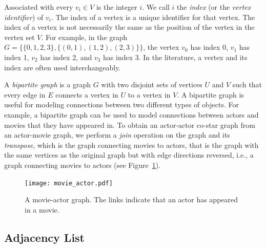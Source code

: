 Associated with every $v_i \in V$ is the integer $i$. We call $i$ the \emph{index}
(or the \emph{vertex identifier}) of $v_i$. The index of a vertex is a unique
identifier for that vertex. The index of a vertex is not necessarily the same
as the position of the vertex in the vertex set $V$. For example, in the graph
$G = \{ \{ 0, 1, 2, 3 \}, \{ (0, 1), (1, 2), (2, 3) \} \}$, the vertex $v_0$ has index 0,
$v_1$ has index 1, $v_2$ has index 2, and $v_3$ has index 3. In the literature,
a vertex and its index are often used interchangeably.



A \emph{bipartite graph} is a graph $G$ with two disjoint sets of
vertices $U$ and $V$ such that every edge in $E$ connects a vertex
in $U$ to a vertex in $V$. A bipartite graph is useful for modeling
connections between two different types of objects. For example,
a bipartite graph can be used to model connections between
actors and movies that they have appeared in. To obtain
an actor-actor co-star graph from an actor-movie graph, we
perform a \emph{join} operation on the graph and its \emph{transpose}, which is
the graph connecting movies to actors, that is the graph with the same
vertices as the original graph but with edge directions reversed, i.e., a graph
connecting movies to actors (see Figure~\ref{fig:movie_actor}).

\begin{figure}[ht]
  \begin{center}
    \texttt{[image: movie\_actor.pdf]}\label{fig:movie_actor}
    \caption{A movie-actor graph. The links indicate that an actor has appeared in a movie.\label{fig:movie_actor}}
  \end{center}
\end{figure}

\subsection{Adjacency List}

